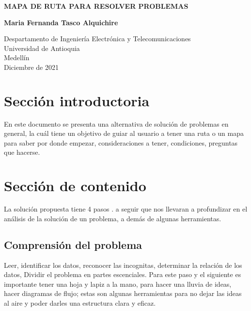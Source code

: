 \documentclass{article}
\begin{document}
\begin{titlepage}
    \begin{center}
        \vspace*{1cm}
            
        \Huge
        \textbf{MAPA DE RUTA PARA RESOLVER PROBLEMAS}
            
        \vspace{0.5cm}
        \LARGE
        
            
        \vspace{5cm}
            
        \textbf{Maria Fernanda Tasco Alquichire}
            
        \vfill
            
        \vspace{0.8cm}
            
        \Large
        Despartamento de Ingeniería Electrónica y Telecomunicaciones\\
        Universidad de Antioquia\\
        Medellín\\
        Diciembre de 2021
            
    \end{center}
\end{titlepage}

\tableofcontents
\newpage
\section{Sección introductoria}\label{intro}
En este documento se presenta una alternativa de solución de problemas en general, la cuál tiene un objetivo de guiar al usuario a tener una ruta o un mapa para saber por donde empezar, consideraciones a tener, condiciones, preguntas que hacerse.

\section{Sección de contenido} \label{contenido}
La solución propuesta tiene 4 pasos \cite{EDEGE}. a seguir que nos llevaran a profundizar en el análisis de la solución de un problema, a demás de algunas herramientas.
\subsection{Comprensión del problema}
Leer, identificar los datos, reconocer las incognitas, determinar la relación de los datos, Dividir el problema en partes escenciales. Para este paso y el siguiente es importante tener una hoja y lapiz a la mano, para hacer una lluvia de ideas, hacer diagramas de flujo; estas son algunas herramientas para no dejar las ideas al aire y poder darles una estructura clara y eficaz.
\end{document}
